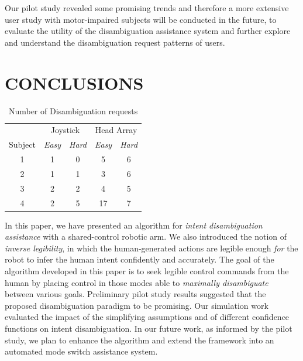 \documentclass[conference]{IEEEtran}
\begin{document}
Our pilot study revealed some promising trends and therefore a more extensive user study with motor-impaired subjects will be conducted in the future, to evaluate the utility of the disambiguation assistance system and further explore and understand the disambiguation request patterns of users.
\section{CONCLUSIONS}\label{DC}
\begin{table}[t]
	\centering
	\begin{tabular}{ccccc}
		\toprule
		&\multicolumn{2}{c}{Joystick}
		&
		\multicolumn{2}{c}{Head Array} \\\cmidrule(r){2-3}\cmidrule(l){4-5}
		Subject &\textit{Easy}& \textit{Hard}    & \textit{Easy} &\textit{Hard}      \\
		\bottomrule
		1 &1& 0   & 5 & 6  \\
		\bottomrule
		2 &1& 1    & 3 & 6      \\
		\bottomrule
		3 &2& 2    & 4 &5    \\
		\bottomrule
		4 &2& 5    & 17 &7   \\
		\bottomrule
	\end{tabular}
	\vspace{.2cm}
	\caption{Number of Disambiguation requests}
	\label{ONDEMAND}
\end{table}
In this paper, we have presented an algorithm for \textit{intent disambiguation assistance} with a shared-control robotic arm. We also introduced the notion of \textit{inverse legibility}, in which the human-generated actions are legible enough \textit{for} the robot to infer the human intent confidently and accurately. The goal of the algorithm developed in this paper is to seek legible control commands from the human by placing control in those modes able to \textit{maximally disambiguate} between various goals. Preliminary pilot study results suggested that the proposed disambiguation paradigm to be promising. Our simulation work evaluated the impact of the simplifying assumptions and of different confidence functions on intent disambiguation. In our future work, as informed by the pilot study, we plan to enhance the algorithm and extend the framework into an automated mode switch assistance system. 
\end{document}
